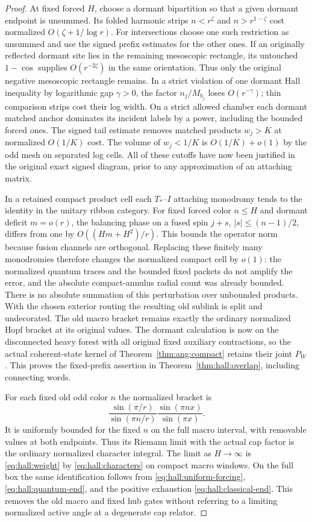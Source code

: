 \begin{proof}
At fixed forced \(H\), choose a dormant bipartition so that a given
dormant endpoint is unsummed. Its folded harmonic strips
\(n<r^\zeta\) and \(n>r^{1-\zeta}\) cost normalized
\(O(\zeta+1/\log r)\). For intersections choose one such restriction
as unsummed and use the signed prefix estimates for the other
ones. If an originally reflected dormant site lies in the remaining
mesoscopic rectangle, its untouched \(1-\cos\) supplies
\(O(r^{-2\zeta})\) in the same orientation. Thus only the original
negative mesoscopic rectangle remains. In a strict violation of one
dormant Hall inequality by logarithmic gap \(\gamma>0\), the factor
\(n_j/M_{b_j}\) loses \(O(r^{-\gamma})\); thin comparison strips cost
their log width. On a strict allowed chamber each dormant matched
anchor dominates its incident labels by a power, including the
bounded forced ones. The signed tail estimate removes matched
products \(w_j>K\) at normalized \(O(1/K)\) cost. The volume of
\(w_j<1/K\) is \(O(1/K)+o(1)\) by the odd mesh on separated log
cells. All of these cutoffs have now been justified in the
original exact signed diagram, prior to any approximation of an
attaching matrix.

In a retained compact product cell each \(T_*\)--\(I\) attaching
monodromy tends to the identity in the unitary ribbon category.
For fixed forced color \(n\le H\) and dormant deficit \(m=o(r)\),
the balancing phase on a fused spin \(j+s\), \(|s|\le(n-1)/2\),
differs from one by \(O((Hm+H^2)/r)\). This bounds the operator
norm because fusion channels are orthogonal. Replacing these
finitely many monodromies therefore changes the normalized compact
cell by \(o(1)\): the normalized quantum traces and the bounded
fixed packets do not amplify the error, and the absolute
compact-annulus radial count was already bounded. There is no
absolute summation of this perturbation over unbounded products.
With the chosen exterior routing the resulting old sublink is
split and undecorated. The old macro bracket remains exactly the
ordinary normalized Hopf bracket at its original values. The
dormant calculation is now on the disconnected heavy forest with
all original fixed auxiliary contractions, so the actual
coherent-state kernel of Theorem~\ref{thm:ang:compact} retains their
joint \(P_W\). This proves the fixed-prefix assertion in
Theorem~\ref{thm:hall:overlap}, including connecting words.

For each fixed old odd color \(n\) the normalized bracket is
\[
 \frac{\sin(\pi/r)}{\sin(\pi n/r)}
                      \frac{\sin(\pi n x)}{\sin(\pi x)} .
\]
It is uniformly bounded for the fixed \(n\) on the full macro
interval, with removable values at both endpoints. Thus its Riemann
limit with the actual cap factor is the ordinary normalized
character integral. The limit as \(H\to\infty\) is
\eqref{eq:hall:weight} by \eqref{eq:hall:characters} on compact
macro windows. On the full box the same identification follows
from \eqref{eq:hall:uniform-forcing},
\eqref{eq:hall:quantum-end}, and the positive exhaustion
\eqref{eq:hall:classical-end}. This removes the old macro and
fixed hub gates without referring to a limiting normalized active
angle at a degenerate cap relator.


\end{proof}
